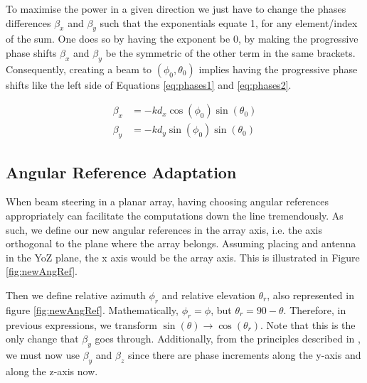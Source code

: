 To maximise the power in a given direction we just have to change the phases differences $\beta_x$ and $\beta_y$ such that the exponentials equate 1, for any element/index of the sum. One does so by having the exponent be 0, by making the progressive phase shifts $\beta_x$ and $\beta_y$ be the symmetric of the other term in the same brackets. Consequently, creating a beam to $(\phi_0, \theta_0)$ implies having the progressive phase shifts like the left side of Equations \eqref{eq:phases1} and \eqref{eq:phases2}.

\begin{subequations}
    \begin{align}
        \beta_x &= -k d_x \cos(\phi_0) \sin(\theta_0) \label{eq:phases1} \\
        \beta_y &= -k d_y \sin(\phi_0) \sin(\theta_0) \label{eq:phases2}
    \end{align}
\end{subequations}


\subsection*{Angular Reference Adaptation}
When beam steering in a planar array, having choosing angular references appropriately can facilitate the computations down the line tremendously. As such, we define our new angular references in the array axis, i.e. the axis orthogonal to the plane where the array belongs. Assuming placing and antenna in the YoZ plane, the x axis would be the array axis. This is illustrated in Figure \ref{fig:newAngRef}.




Then we define relative azimuth $\phi_r$ and relative elevation $\theta_r$, also represented in figure \ref{fig:newAngRef}. Mathematically, $\phi_r = \phi$, but $\theta_r = 90 - \theta$. Therefore, in previous expressions, we transform $\sin(\theta) \rightarrow \cos(\theta_r)$. Note that this is the only change that $\beta_y$ goes through. Additionally, from the principles described in \cite{balanis_antennas}, we must now use $\beta_y$ and $\beta_z$ since there are phase increments along the y-axis and along the z-axis now.

